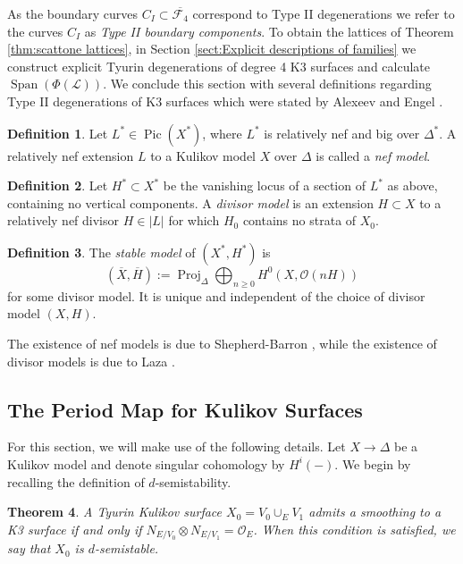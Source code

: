 \documentclass[a4paper]{amsart}
\theoremstyle{definition}
\newtheorem{defn}{Definition}[section]
\theoremstyle{plain}
\newtheorem{theorem}[defn]{Theorem}
\theoremstyle{remark}
\begin{document}
As the boundary curves $C_I \subset \overline{\mathcal{F}_4}$ correspond to Type II degenerations we refer to the curves $C_I$ as \emph{Type II boundary components}. To obtain the lattices of Theorem \ref{thm:scattone lattices}, in Section \ref{sect:Explicit descriptions of families} we construct explicit Tyurin degenerations of degree 4 K3 surfaces and calculate $\operatorname{Span}(\Phi(\mathscr{L}))$. We conclude this section with several definitions regarding Type II degenerations of K3 surfaces which were stated by Alexeev and Engel \cite{AE23}.

\begin{defn}
Let $L^*\in\operatorname{Pic}(X^*)$, where $L^*$ is relatively nef and big over $\Delta^*$. A relatively nef extension $L$ to a Kulikov model $X$ over $\Delta$ is called a \emph{nef model}.
\end{defn}

\begin{defn}
Let $H^*\subset X^*$ be the vanishing locus of a section of $L^*$ as above, containing no vertical components. A \emph{divisor model} is an extension $H \subset X$ to a relatively nef divisor $H\in|L|$ for which $H_0$ contains no strata of $X_0$.
\end{defn}

\begin{defn}
The \emph{stable model} of $(X^*,H^*)$ is 
$$(\overline{X},\overline{H}):=\operatorname{Proj}_\Delta\bigoplus_{n\geq0}H^0(X,\mathcal{O}(nH))$$
for some divisor model. It is unique and independent of the choice of divisor model $(X,H)$.
\end{defn}

The existence of nef models is due to Shepherd-Barron \cite{SB83}, while the existence of divisor models is due to Laza \cite[Theorem 2.11]{Laza16}.

\subsection{The Period Map for Kulikov Surfaces} For this section, we will make use of the following details. Let $X\rightarrow \Delta$ be a Kulikov model and denote singular cohomology by $H^i(-)$. We begin by recalling the definition of $d$-semistability.

\begin{theorem}\cite{Fried84}
A Tyurin Kulikov surface $X_0=V_0\cup_E V_1$ admits a smoothing to a K3 surface if and only if $N_{E/V_0}\otimes N_{E/V_1}=\mathcal{O}_E$. When this condition is satisfied, we say that $X_0$ is \emph{$d$-semistable}.
\end{theorem}
\end{document}
